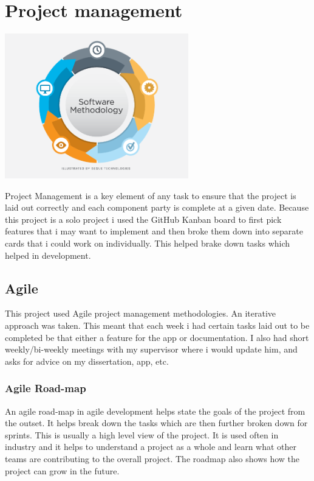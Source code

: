 \section{Project management}
\begin{center}
    \includegraphics[width=8cm,keepaspectratio]{Images/Software_Method.png}

\end{center}
\par
\par
\medskip
Project Management is a key element of any task to ensure that the project is laid out correctly and each component party is complete at a given date. Because this project is a solo project i used the GitHub Kanban board to first pick features that i may want to implement and then broke them down into separate cards that i could work on individually. This helped brake down tasks which helped in development.

\subsection{Agile}
This project used Agile project management methodologies. An iterative approach was taken. This meant that each week i had certain tasks laid out to be completed be that either a feature for the app or documentation. I also had short weekly/bi-weekly meetings with my supervisor where i would update him, and asks for advice on my dissertation, app, etc. 

\subsubsection{Agile Road-map}
An agile road-map in agile development helps state the goals of the project from the outset. It helps break down the tasks which are then further broken down for sprints. This is usually a high level view of the project. It is used often in industry and it helps to understand a project as a whole and learn what other teams are contributing to the overall project. The roadmap also shows how the project can grow in the future.

